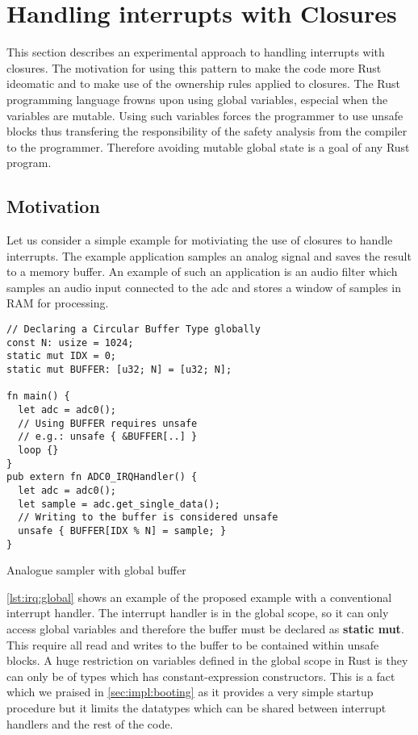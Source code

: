 \section{Handling interrupts with Closures}
\label{sec:irq-closures}

This section describes an experimental approach to handling interrupts with closures.
The motivation for using this pattern to make the code more Rust ideomatic and to make use of the ownership rules applied to closures.
The Rust programming language frowns upon using global variables, especial when the variables are mutable.
Using such variables forces the programmer to use unsafe blocks thus transfering the responsibility of the safety analysis from the compiler to the programmer.
Therefore avoiding mutable global state is a goal of any Rust program.

\subsection{Motivation}
\label{sec:irq:motivation}

Let us consider a simple example for motiviating the use of closures to handle interrupts.
The example application samples an analog signal and saves the result to a memory buffer.
An example of such an application is an audio filter which samples an audio input connected to the \gls{adc} and stores a window of samples in RAM for processing.

\begin{listing}[H]
  \begin{verbatim}
// Declaring a Circular Buffer Type globally
const N: usize = 1024;
static mut IDX = 0;
static mut BUFFER: [u32; N] = [u32; N];

fn main() {
  let adc = adc0();
  // Using BUFFER requires unsafe
  // e.g.: unsafe { &BUFFER[..] }
  loop {}
}
pub extern fn ADC0_IRQHandler() {
  let adc = adc0();
  let sample = adc.get_single_data();
  // Writing to the buffer is considered unsafe
  unsafe { BUFFER[IDX % N] = sample; }
}
  \end{verbatim}
  \caption{Analogue sampler with global buffer}
  \label{lst:irq:global}
\end{listing}

\autoref{lst:irq:global} shows an example of the proposed example with a conventional interrupt handler.
The interrupt handler is in the global scope, so it can only access global variables and therefore the buffer must be declared as \textbf{static mut}.
This require all read and writes to the buffer to be contained within unsafe blocks.
A huge restriction on variables defined in the global scope in Rust is they can only be of types which has constant-expression constructors.
This is a fact which we praised in \autoref{sec:impl:booting} as it provides a very simple startup procedure but it limits the datatypes which can be shared between interrupt handlers and the rest of the code.


